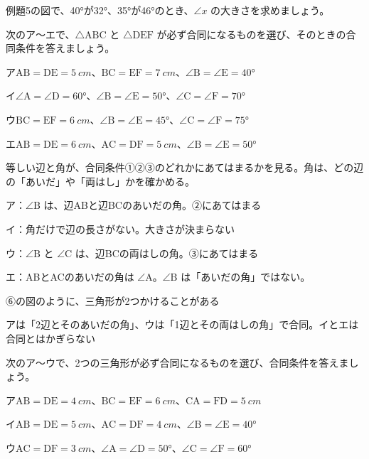 \begin{jibun}
例題5の図で、40°が32°、35°が46°のとき、$\angle x$ の大きさを求めましょう。
\end{jibun}

\begin{reidai}[合同条件]
次のア〜エで、$\triangle\mathrm{ABC}$ と $\triangle\mathrm{DEF}$ が必ず合同になるものを選び、そのときの合同条件を答えましょう。\par
ア\enspace $\mathrm{AB}=\mathrm{DE}=\qty{5}{cm}$、$\mathrm{BC}=\mathrm{EF}=\qty{7}{cm}$、$\angle\mathrm{B}=\angle\mathrm{E}=40°$\par
イ\enspace $\angle\mathrm{A}=\angle\mathrm{D}=60°$、$\angle\mathrm{B}=\angle\mathrm{E}=50°$、$\angle\mathrm{C}=\angle\mathrm{F}=70°$\par
ウ\enspace $\mathrm{BC}=\mathrm{EF}=\qty{6}{cm}$、$\angle\mathrm{B}=\angle\mathrm{E}=45°$、$\angle\mathrm{C}=\angle\mathrm{F}=75°$\par
エ\enspace $\mathrm{AB}=\mathrm{DE}=\qty{6}{cm}$、$\mathrm{AC}=\mathrm{DF}=\qty{5}{cm}$、$\angle\mathrm{B}=\angle\mathrm{E}=50°$\par
\kangaekata 等しい辺と角が、合同条件①②③のどれかにあてはまるかを見る。角は、どの辺の「あいだ」や「両はし」かを確かめる。\par
\shiki ア：$\angle\mathrm{B}$ は、辺ABと辺BCのあいだの角。②にあてはまる\par
\hspace*{2.6\zw}イ：角だけで辺の長さがない。大きさが決まらない\par
\hspace*{2.6\zw}ウ：$\angle\mathrm{B}$ と $\angle\mathrm{C}$ は、辺BCの両はしの角。③にあてはまる\par
\hspace*{2.6\zw}エ：ABとACのあいだの角は $\angle\mathrm{A}$。$\angle\mathrm{B}$ は「あいだの角」ではない。\par
\hspace*{4.6\zw}⑥の図のように、三角形が2つかけることがある\par
\kotae アは「2辺とそのあいだの角」、ウは「1辺とその両はしの角」で合同。イとエは合同とはかぎらない
\end{reidai}

\begin{jibun}
次のア〜ウで、2つの三角形が必ず合同になるものを選び、合同条件を答えましょう。\par
ア\enspace $\mathrm{AB}=\mathrm{DE}=\qty{4}{cm}$、$\mathrm{BC}=\mathrm{EF}=\qty{6}{cm}$、$\mathrm{CA}=\mathrm{FD}=\qty{5}{cm}$\par
イ\enspace $\mathrm{AB}=\mathrm{DE}=\qty{5}{cm}$、$\mathrm{AC}=\mathrm{DF}=\qty{4}{cm}$、$\angle\mathrm{B}=\angle\mathrm{E}=40°$\par
ウ\enspace $\mathrm{AC}=\mathrm{DF}=\qty{3}{cm}$、$\angle\mathrm{A}=\angle\mathrm{D}=50°$、$\angle\mathrm{C}=\angle\mathrm{F}=60°$
\end{jibun}

